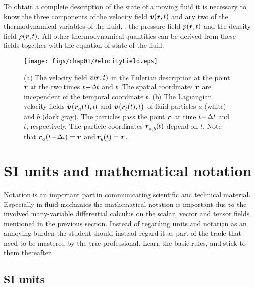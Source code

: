 To obtain a complete description of the state of a moving fluid it
is necessary to know the three components of the velocity field
$\bm{v}(\bm{r},t)$ and any two of the thermodynamical variables of the
fluid, \eg, the pressure field $p(\bm{r},t)$ and the density field
$\rho(\bm{r},t)$. All other thermodynamical quantities can be
derived from these fields together with the equation of state of
the fluid.

\begin{figure}
\centerline{
  \texttt{[image: figs/chap01/VelocityField.eps]}}
\caption[Velocity fields: Eulerian and
Lagrangian]{ (a) The velocity field
$\bm{v}(\bm{r},t)$ in the Eulerian description at the point $\bm{r}$ at
the two times $t\!-\!\Delta t$ and $t$. The spatial coordinates
$\bm{r}$ are independent of the temporal coordinate $t$. (b) The
Lagrangian velocity fields $\bm{v}\big(\bm{r}^{{}}_a(t),t\big)$ and
$\bm{v}\big(\bm{r}^{{}}_b(t),t\big)$ of fluid particles $a$ (white)
and $b$ (dark gray). The particles pass the point $\bm{r}$ at time
$t\!-\!\Delta t$ and $t$, respectively. The particle coordinates
$\bm{r}^{{}}_{a,b}(t)$ depend on $t$. Note that
$\bm{r}^{{}}_a(t\!-\!\Delta t) = \bm{r}$ and $\bm{r}^{{}}_b(t) = \bm{r}$.}
\end{figure}

\section{SI units and mathematical notation}

Notation is an important part in communicating scientific and
technical material. Especially in fluid mechanics the mathematical
notation is important due to the involved many-variable
differential calculus on the scalar, vector and tensor fields
mentioned in the previous section. Instead of regarding units and
notation as an annoying burden the student should instead regard
it as part of the trade that need to be mastered by the true
professional. Learn the basic rules, and stick to them thereafter.


\subsection{SI units}

